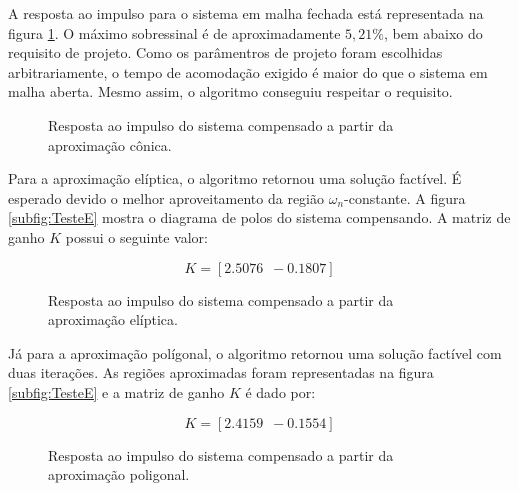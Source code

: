 A resposta ao impulso para o sistema em malha fechada está representada na figura \ref{fig:TesteC}. O máximo sobressinal é de aproximadamente $5,21\%$, bem abaixo do requisito de projeto.  Como os parâmentros de projeto foram escolhidas arbitrariamente, o tempo de acomodação exigido é maior do que o sistema em malha aberta. Mesmo assim, o algoritmo conseguiu respeitar o requisito.

\begin{figure}[!ht]
  \centering
  
  \caption{Resposta ao impulso do sistema compensado a partir da aproximação cônica.}
  \label{fig:TesteC}
\end{figure}

Para a aproximação elíptica, o algoritmo retornou uma solução factível. É esperado devido o melhor aproveitamento da região $\omega_n$-constante. A figura \ref{subfig:TesteE} mostra o diagrama de polos do sistema compensando. A matriz de ganho $K$ possui o seguinte valor:

\begin{equation}
  K = \left[2.5076 \enspace -0.1807\right]\label{res:GanhoE}
\end{equation}

\begin{figure}[!ht]
  \centering
  
  \caption{Resposta ao impulso do sistema compensado a partir da aproximação elíptica.}
  \label{fig:TesteE}
\end{figure}

Já para a aproximação polígonal, o algoritmo retornou uma solução factível com duas iterações. As regiões aproximadas foram representadas na figura \ref{subfig:TesteE} e a matriz de ganho $K$ é dado por:

\begin{equation}
  K = \left[2.4159 \enspace -0.1554\right]\label{res:GanhoP}
\end{equation}

\begin{figure}[!ht]
  \centering
  
  \caption{Resposta ao impulso do sistema compensado a partir da aproximação poligonal.}
  \label{fig:TesteP}
\end{figure}